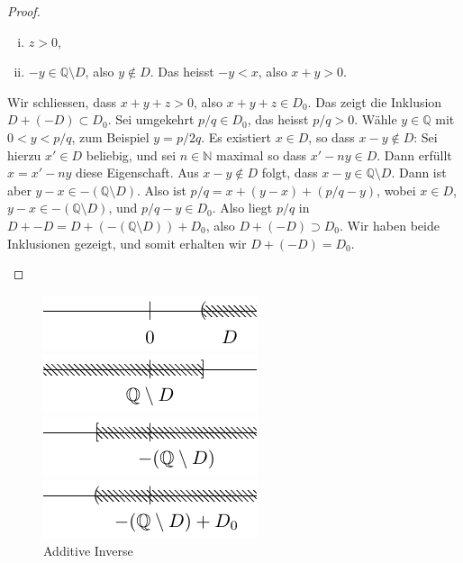 \documentclass[../main.tex]{subfiles}
\begin{document}
\begin{proof}
\begin{itemize}
\begin{enumerate}[(i)]
        \item $z > 0$,
        \item $-y \in \mathbb Q \setminus D$, also $y \notin D$.
          Das heisst $-y < x$, also $x + y > 0$.
      \end{enumerate}
      Wir schliessen, dass $x + y + z > 0$, also $x + y + z \in D_{0}$.
      Das zeigt die Inklusion $D + (-D) \subset D_{0}$. Sei umgekehrt
      $p/q \in D_{0}$, das heisst $p/q > 0$. Wähle $y \in \mathbb Q$
      mit $0 < y < p/q$, zum Beispiel $y = p/2q$.
      Es existiert $x \in D$, so dass $x - y \notin D$:
      Sei hierzu $x' \in D$ beliebig, und sei $n \in \mathbb N$ maximal
      so dass $x' -ny \in D$. Dann erfüllt $x = x' - ny$ diese Eigenschaft.
      Aus $x - y \notin D$ folgt, dass $x- y \in \mathbb Q \setminus D$.
      Dann ist aber $y - x \in - (\mathbb Q \setminus D)$.
      Also ist $p/q = x + (y-x) + (p/q - y)$, wobei
      $x \in D$, $y - x \in -(\mathbb Q \setminus D)$, und $p/q - y \in D_{0}$.
      Also liegt $p/q$ in $D + -D = D + (-(\mathbb Q \setminus D)) + D_{0}$,
      also $D + (-D) \supset D_{0}$. Wir haben beide Inklusionen gezeigt,
      und somit
      erhalten wir $D + (-D) = D_{0}$. \qedhere
  \end{itemize}
\end{proof}

\begin{figure}[htb]
  \centering
  \begin{minipage}{0.4\linewidth}
    \centering
    \includegraphics{images/dedekind-additiv-invers1}
  \end{minipage}%
  \begin{minipage}{0.4\linewidth}
    \centering
    \includegraphics{images/dedekind-additiv-invers2}
  \end{minipage}
  \begin{minipage}{0.4\linewidth}
    \centering
    \includegraphics{images/dedekind-additiv-invers3}
  \end{minipage}%
  \begin{minipage}{0.4\linewidth}
    \centering
    \includegraphics{images/dedekind-additiv-invers4}
  \end{minipage}
  \caption{Additive Inverse}%
  \label{fig:additiv-dedekind}
\end{figure}
\end{document}
